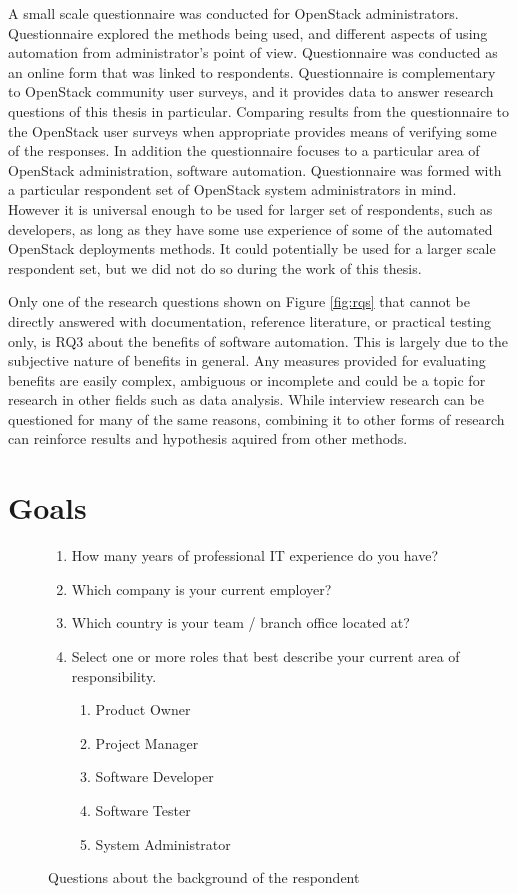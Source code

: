 A small scale questionnaire was conducted for OpenStack administrators.
Questionnaire explored the methods being used, and different aspects of using
automation from administrator's point of view. Questionnaire was conducted as
an online form that was linked to respondents. Questionnaire is complementary
to OpenStack community user surveys, and it provides data to answer research
questions of this thesis in particular. Comparing results from the
questionnaire to the OpenStack user surveys when appropriate provides means of
verifying some of the responses. In addition the questionnaire focuses to a
particular area of OpenStack administration, software automation. Questionnaire
was formed with a particular respondent set of OpenStack system administrators
in mind. However it is universal enough to be used for larger set of
respondents, such as developers, as long as they have some use experience of
some of the automated OpenStack deployments methods. It could potentially be
used for a larger scale respondent set, but we did not do so during the work of
this thesis.

Only one of the research questions shown on Figure \ref{fig:rqs} that cannot be
directly answered with documentation, reference literature, or practical
testing only, is RQ3 about the benefits of software automation. This is largely
due to the subjective nature of benefits in general. Any measures provided for
evaluating benefits are easily complex, ambiguous or incomplete and could be a
topic for research in other fields such as data analysis. While interview
research can be questioned for many of the same reasons, combining it to other
forms of research can reinforce results and hypothesis aquired from other
methods.

\section{Goals}

\begin{figure}[t]
\centering
\begin{enumerate}
  \itemsep0em
  \item How many years of professional IT experience do you have?
  \item Which company is your current employer?
  \item Which country is your team / branch office located at?
  \item Select one or more roles that best describe your current area of
        responsibility.
  \begin{enumerate}
    \itemsep0em
    \item Product Owner
    \item Project Manager
    \item Software Developer
    \item Software Tester
    \item System Administrator
  \end{enumerate}
\end{enumerate}
\caption{Questions about the background of the respondent}
\label{fig:questionnaire-background}
\end{figure}

